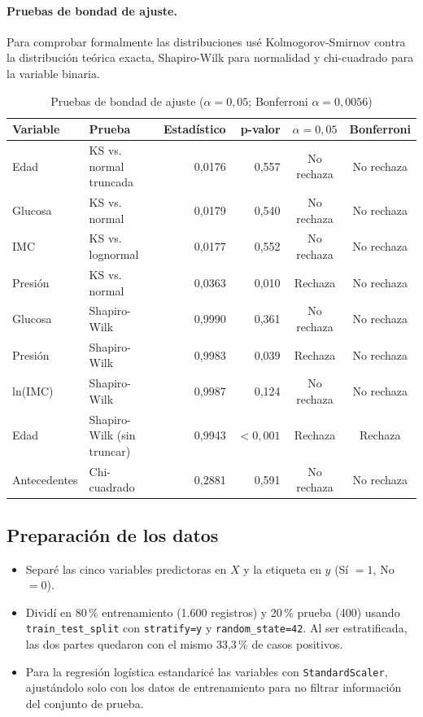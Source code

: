 \documentclass[11pt,letterpaper]{article}
\begin{document}
\paragraph{Pruebas de bondad de ajuste.} Para comprobar formalmente las distribuciones usé
Kolmogorov-Smirnov contra la distribución teórica exacta, Shapiro-Wilk para normalidad y chi-cuadrado para
la variable binaria.

\begin{table}[H]
\centering
\caption{Pruebas de bondad de ajuste ($\alpha = 0{,}05$; Bonferroni $\alpha = 0{,}0056$)}
\small
\begin{tabular}{llrrcc}
\toprule
\textbf{Variable} & \textbf{Prueba} & \textbf{Estadístico} & \textbf{p-valor} & \textbf{$\alpha=0{,}05$} & \textbf{Bonferroni} \\
\midrule
Edad          & KS vs. normal truncada       & 0,0176 & 0,557  & No rechaza & No rechaza \\
Glucosa       & KS vs. normal                & 0,0179 & 0,540  & No rechaza & No rechaza \\
IMC           & KS vs. lognormal             & 0,0177 & 0,552  & No rechaza & No rechaza \\
Presión       & KS vs. normal                & 0,0363 & 0,010  & Rechaza    & No rechaza \\
Glucosa       & Shapiro-Wilk                 & 0,9990 & 0,361  & No rechaza & No rechaza \\
Presión       & Shapiro-Wilk                 & 0,9983 & 0,039  & Rechaza    & No rechaza \\
ln(IMC)       & Shapiro-Wilk                 & 0,9987 & 0,124  & No rechaza & No rechaza \\
Edad          & Shapiro-Wilk (sin truncar)   & 0,9943 & $<0{,}001$ & Rechaza & Rechaza \\
Antecedentes  & Chi-cuadrado                 & 0,2881 & 0,591  & No rechaza & No rechaza \\
\bottomrule
\end{tabular}
\end{table}

\subsection{Preparación de los datos}

\begin{itemize}
  \item Separé las cinco variables predictoras en $X$ y la etiqueta en $y$ (Sí $=1$, No $=0$).
  \item Dividí en 80\,\% entrenamiento (1.600 registros) y 20\,\% prueba (400) usando
        \texttt{train\_test\_split} con \texttt{stratify=y} y \texttt{random\_state=42}. Al ser estratificada, las dos partes
        quedaron con el mismo 33,3\,\% de casos positivos.
  \item Para la regresión logística estandaricé las variables con \texttt{StandardScaler}, ajustándolo solo
        con los datos de entrenamiento para no filtrar información del conjunto de prueba.
\end{itemize}
\end{document}
